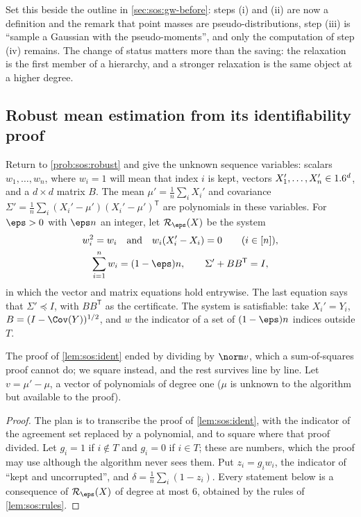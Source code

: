 \begin{refsection}
Set this beside the outline in \cref{sec:sos:gw-before}: steps (i) and (ii) are now a definition and the remark that point masses are pseudo-distributions, step (iii) is ``sample a Gaussian with the pseudo-moments'', and only the computation of step (iv) remains. The change of status matters more than the saving: the relaxation is the first member of a hierarchy, and a stronger relaxation is the same object at a higher degree.

\subsection{Robust mean estimation from its identifiability proof}\label{sec:sos:robust}

Return to \cref{prob:sos:robust} and give the unknown sequence variables: scalars $w_1,\dots,w_n$, where $w_i=1$ will mean that index $i$ is kept, vectors $X_1',\dots,X_n'\in1.6^d$, and a $d\times d$ matrix $B$. The mean $\mu'=\frac1n\sum_iX_i'$ and covariance $\Sigma'=\frac1n\sum_i(X_i'-\mu')(X_i'-\mu')^{\mathsf T}$ are polynomials in these variables. For $\eps>0$ with $\eps n$ an integer, let $\sosR_\eps(X)$ be the system
\[
  \begin{gathered}
  w_i^2=w_i\quad\text{and}\quad w_i(X_i'-X_i)=0\qquad(i\in[n]),\\
  \sum_{i=1}^nw_i=(1-\eps)n,\qquad \Sigma'+BB^{\mathsf T}=I,
  \end{gathered}
\]
in which the vector and matrix equations hold entrywise. The last equation says that $\Sigma'\preceq I$, with $BB^{\mathsf T}$ as the certificate. The system is satisfiable: take $X_i'=Y_i$, $B=(I-\Cov(Y))^{1/2}$, and $w$ the indicator of a set of $(1-\eps)n$ indices outside $T$.

The proof of \cref{lem:sos:ident} ended by dividing by $\norm v$, which a sum-of-squares proof cannot do; we square instead, and the rest survives line by line. Let $v=\mu'-\mu$, a vector of polynomials of degree one ($\mu$ is unknown to the algorithm but available to the proof).


\begin{proof}
The plan is to transcribe the proof of \cref{lem:sos:ident}, with the indicator of the agreement set replaced by a polynomial, and to square where that proof divided. Let $g_i=1$ if $i\notin T$ and $g_i=0$ if $i\in T$; these are numbers, which the proof may use although the algorithm never sees them. Put $z_i=g_iw_i$, the indicator of ``kept and uncorrupted'', and $\delta=\frac1n\sum_i(1-z_i)$. Every statement below is a consequence of $\sosR_\eps(X)$ of degree at most $6$, obtained by the rules of \cref{lem:sos:rules}.


\end{proof}
\end{refsection}

